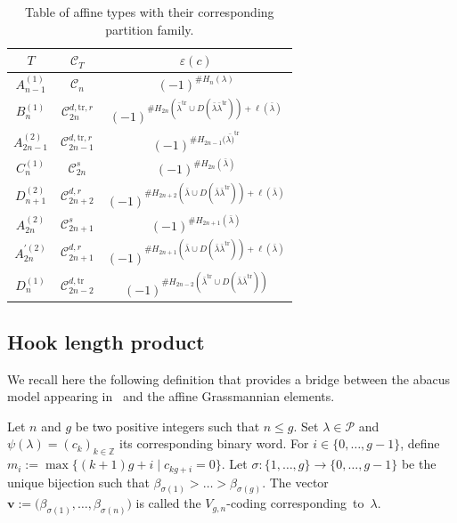 \documentclass[10pt,a4paper]{amsart}
\numberwithin{equation}{section}
\newcommand{\cC}{\mathcal{C}}
\def\ccp{\mathcal P}
\newcommand{\Z}{\mathbb{Z}}
\begin{document}
\begin{table}[th]\centering\renewcommand{\arraystretch}{1.32}
\caption{Table of affine types with their corresponding partition family.}\label{tableau}
\begin{tabular}{|c|c|c|}
\hline
$T$ & $\cC_T$ & $\varepsilon(c)$ \\
\hline
\rule{0pt}{15pt} $A^{(1)}_{n-1}$ & $\cC_n$ &$(-1)^{\#H_n(\lambda)}$\\
\hline
\rule{0pt}{15pt} $B^{(1)}_{n}$& $\mathcal{C}%
_{2n}^{d,\mathrm{tr},r}$ &$(-1)^{\#H_{2n}(\bar{\lambda}^{\mathrm{tr}}\cup D(\bar{\lambda}\bar{\lambda}^\mathrm{tr}))+\ell(\bar{\lambda})}$ \\
\hline
\rule{0pt}{15pt}$A^{(2)}_{2n-1}$ & $\cC_{2n-1}^{d,\mathrm{tr},r}$ &$(-1)^{\#H_{2n-1}(\bar{\lambda)}^{\mathrm{tr}}}$\\
\hline
\rule{0pt}{15pt}$C^{(1)}_{n}$& $\mathcal{C}_{2n}^{s}$ & $(-1)^{\#H_{2n}(\bar{\lambda})}$\\
\hline
\rule{0pt}{15pt}$D^{(2)}_{n+1}$& $\cC_{2n+2}^{d,r}$ &$(-1)^{\#H_{2n+2}(\bar{\lambda}\cup D(\bar{\lambda}\bar{\lambda}^\mathrm{tr}))+\ell(\bar{\lambda})}$\\
\hline
\rule{0pt}{15pt}$A^{(2)}_{2n}$& $\cC_{2n+1}^s$ &$(-1)^{\#H_{2n+1}(\bar{\lambda})}$\\
\hline
\rule{0pt}{15pt}$A^{\prime (2)}_{2n}$& $\cC_{2n+1}^{d,r}$ &$(-1)^{\#H_{2n+1}(\bar{\lambda}\cup D(\bar{\lambda}\bar{\lambda}^\mathrm{tr}))+\ell(\bar{\lambda})}$ \\
\hline

\rule{0pt}{15pt}$D^{(1)}_{n}$& $\mathcal{C}_{2n-2}^{d,\mathrm{tr}}$ & $(-1)^{\#H_{2n-2}(\bar{\lambda}^{\mathrm{tr}}\cup D(\bar{\lambda}\bar{\lambda}^\mathrm{tr}))}$\\
\hline
\end{tabular}
\end{table}


\subsection{Hook length product}

We recall here the following definition that provides a bridge between the abacus model appearing in~\cite{Wmac} and the affine Grassmannian elements.

\begin{Definition}%
Let $n$ and $g$ be two positive integers such that $n\leq g$. Set $\lambda \in \ccp$ and $\psi(\lambda)=(c_k)_{k\in\Z}$ its corresponding binary word. For $i\in\lbrace 0,\dots,g-1\rbrace$, define $m_i:=\max\lbrace ({k+1})g+i\mid c_{kg+i}=0\rbrace$. Let $\sigma\colon\lbrace 1,\dots,g\rbrace\rightarrow \lbrace 0,\dots,g-1\rbrace$ be the unique bijection such that $\beta_{\sigma(1)}>\dots>\beta_{\sigma(g)}$. The vector $\mathbf{v}:=\bigl(\beta_{\sigma(1)},\dots,\beta_{\sigma(n)}\bigr)$ is called the $V_{g,n}$-coding corresponding~to~$\lambda$.
\end{Definition}
\end{document}
